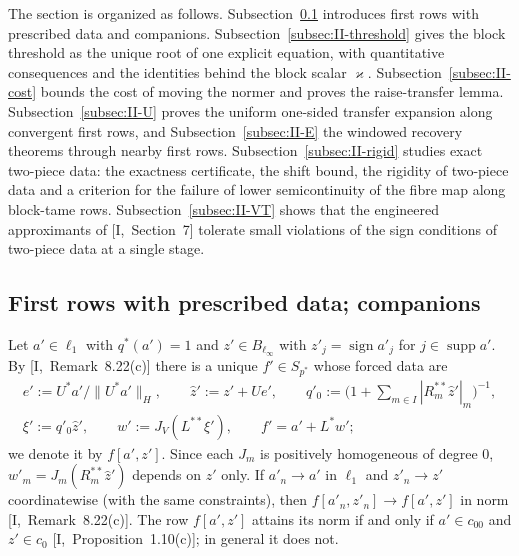 \documentclass[10pt]{amsart}
\theoremstyle{definition}
\theoremstyle{remark}
\newcommand{\supp}{\operatorname{supp}}
\newcommand{\sgn}{\operatorname{sign}}
\newcommand{\zh}{\hat z}
\begin{document}
The section is organized as follows.  Subsection~\ref{subsec:II-comp}
introduces first rows with prescribed data and companions.
Subsection~\ref{subsec:II-threshold} gives the block threshold as the
unique root of one explicit equation, with quantitative consequences and
the identities behind the block scalar $\varkappa$.
Subsection~\ref{subsec:II-cost} bounds the cost of moving the normer and
proves the raise-transfer lemma.  Subsection~\ref{subsec:II-U} proves the
uniform one-sided transfer expansion along convergent first rows, and
Subsection~\ref{subsec:II-E} the windowed recovery theorems through nearby
first rows.  Subsection~\ref{subsec:II-rigid} studies exact two-piece
data: the exactness certificate, the shift bound, the rigidity of two-piece
data and a criterion for the failure of lower semicontinuity of the fibre
map along block-tame rows.  Subsection~\ref{subsec:II-VT} shows that the engineered approximants
of [I,~Section~7] tolerate small violations of the sign conditions of
two-piece data at a single stage.

\subsection{First rows with prescribed data; companions}\label{subsec:II-comp}

Let $a'\in\ell_1$ with $q^*(a')=1$ and $z'\in B_{\ell_\infty}$ with
$z'_j=\sgn a'_j$ for $j\in\supp a'$.  By [I,~Remark~8.22(c)] there is a
unique $f'\in S_{p^*}$ whose forced data are
\begin{gather*}
 e':=U^*a'/\|U^*a'\|_H,\qquad \zh':=z'+Ue',\qquad
 q'_0:=\Big(1+\sum_{m\in I}|R_m^{**}\zh'|_m\Big)^{-1},\\
 \xi':=q'_0\zh',\qquad w':=J_V(L^{**}\xi'),\qquad f'=a'+L^*w' ;
\end{gather*}
we denote it by $f[a',z']$.  Since each $J_m$ is positively homogeneous of
degree $0$, $w'_m=J_m(R_m^{**}\zh')$ depends on $\zh'$ only.  If $a'_n\to a'$
in $\ell_1$ and $z'_n\to z'$ coordinatewise (with the same constraints),
then $f[a'_n,z'_n]\to f[a',z']$ in norm [I,~Remark~8.22(c)].  The row
$f[a',z']$ attains its norm if and only if $a'\in c_{00}$ and $z'\in c_0$
[I,~Proposition~1.10(c)]; in general it does not.
\end{document}
